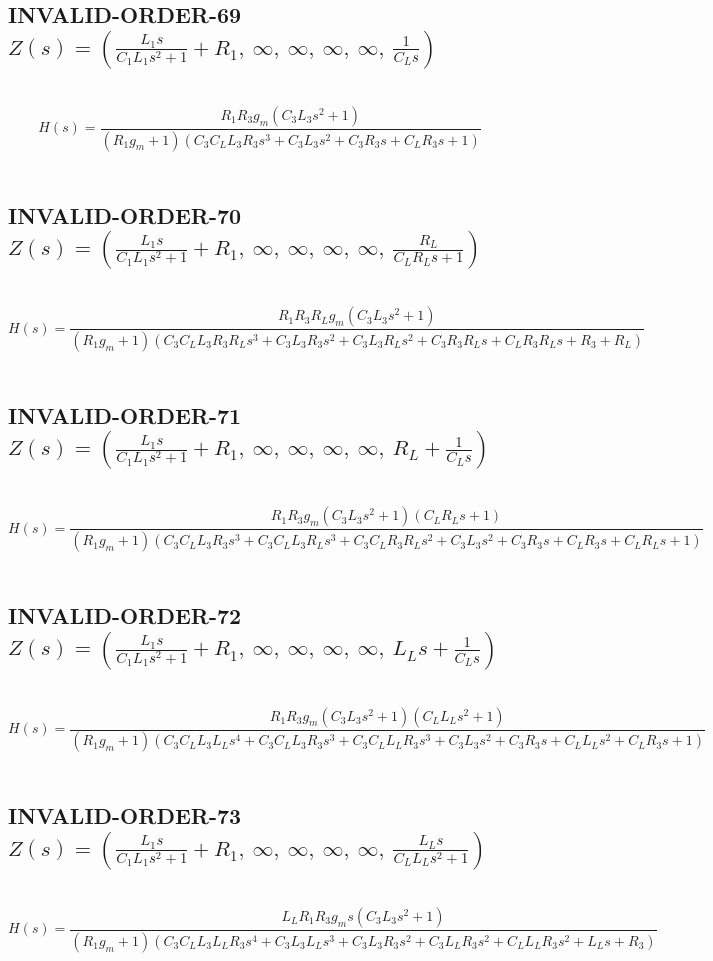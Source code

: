 \documentclass{article}
\begin{document}
\subsection{INVALID-ORDER-69 $Z(s) = \left( \frac{L_{1} s}{C_{1} L_{1} s^{2} + 1} + R_{1}, \  \infty, \  \infty, \  \infty, \  \infty, \  \frac{1}{C_{L} s}\right)$ } \ 
\textbf{\[H(s) = \frac{R_{1} R_{3} g_{m} \left(C_{3} L_{3} s^{2} + 1\right)}{\left(R_{1} g_{m} + 1\right) \left(C_{3} C_{L} L_{3} R_{3} s^{3} + C_{3} L_{3} s^{2} + C_{3} R_{3} s + C_{L} R_{3} s + 1\right)}\] } \ 
\subsection{INVALID-ORDER-70 $Z(s) = \left( \frac{L_{1} s}{C_{1} L_{1} s^{2} + 1} + R_{1}, \  \infty, \  \infty, \  \infty, \  \infty, \  \frac{R_{L}}{C_{L} R_{L} s + 1}\right)$ } \ 
\textbf{\[H(s) = \frac{R_{1} R_{3} R_{L} g_{m} \left(C_{3} L_{3} s^{2} + 1\right)}{\left(R_{1} g_{m} + 1\right) \left(C_{3} C_{L} L_{3} R_{3} R_{L} s^{3} + C_{3} L_{3} R_{3} s^{2} + C_{3} L_{3} R_{L} s^{2} + C_{3} R_{3} R_{L} s + C_{L} R_{3} R_{L} s + R_{3} + R_{L}\right)}\] } \ 
\subsection{INVALID-ORDER-71 $Z(s) = \left( \frac{L_{1} s}{C_{1} L_{1} s^{2} + 1} + R_{1}, \  \infty, \  \infty, \  \infty, \  \infty, \  R_{L} + \frac{1}{C_{L} s}\right)$ } \ 
\textbf{\[H(s) = \frac{R_{1} R_{3} g_{m} \left(C_{3} L_{3} s^{2} + 1\right) \left(C_{L} R_{L} s + 1\right)}{\left(R_{1} g_{m} + 1\right) \left(C_{3} C_{L} L_{3} R_{3} s^{3} + C_{3} C_{L} L_{3} R_{L} s^{3} + C_{3} C_{L} R_{3} R_{L} s^{2} + C_{3} L_{3} s^{2} + C_{3} R_{3} s + C_{L} R_{3} s + C_{L} R_{L} s + 1\right)}\] } \ 
\subsection{INVALID-ORDER-72 $Z(s) = \left( \frac{L_{1} s}{C_{1} L_{1} s^{2} + 1} + R_{1}, \  \infty, \  \infty, \  \infty, \  \infty, \  L_{L} s + \frac{1}{C_{L} s}\right)$ } \ 
\textbf{\[H(s) = \frac{R_{1} R_{3} g_{m} \left(C_{3} L_{3} s^{2} + 1\right) \left(C_{L} L_{L} s^{2} + 1\right)}{\left(R_{1} g_{m} + 1\right) \left(C_{3} C_{L} L_{3} L_{L} s^{4} + C_{3} C_{L} L_{3} R_{3} s^{3} + C_{3} C_{L} L_{L} R_{3} s^{3} + C_{3} L_{3} s^{2} + C_{3} R_{3} s + C_{L} L_{L} s^{2} + C_{L} R_{3} s + 1\right)}\] } \ 
\subsection{INVALID-ORDER-73 $Z(s) = \left( \frac{L_{1} s}{C_{1} L_{1} s^{2} + 1} + R_{1}, \  \infty, \  \infty, \  \infty, \  \infty, \  \frac{L_{L} s}{C_{L} L_{L} s^{2} + 1}\right)$ } \ 
\textbf{\[H(s) = \frac{L_{L} R_{1} R_{3} g_{m} s \left(C_{3} L_{3} s^{2} + 1\right)}{\left(R_{1} g_{m} + 1\right) \left(C_{3} C_{L} L_{3} L_{L} R_{3} s^{4} + C_{3} L_{3} L_{L} s^{3} + C_{3} L_{3} R_{3} s^{2} + C_{3} L_{L} R_{3} s^{2} + C_{L} L_{L} R_{3} s^{2} + L_{L} s + R_{3}\right)}\] } \ 
\end{document}
